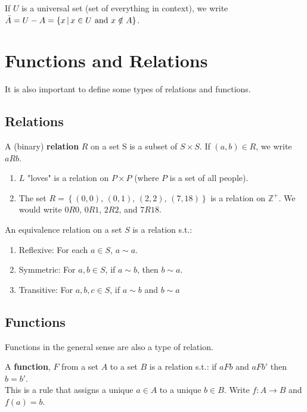 \documentclass[../main.tex]{subfiles}
\begin{document}
If \( U \) is a universal set (set of everything in context), we write
\( \bar{A} = U - A \\ = \{ x \, | \, x \in U \text{ and } x \notin A \} \).

\section{Functions and Relations}

It is also important to define some types of relations and functions.

\subsection{Relations}

\begin{definition}[Relation]
    A (binary) \textbf{relation} \( R \) on a set S is a subset of \( S \times S \). If \( (a,b) \in R \), we write \( aRb \).
\end{definition}

\begin{example}[of relations]

    \begin{enumerate}
        \item \( L \) "loves" is a relation on \( P \times P \) (where \( P \) is a set of all people).
        \item The set \( R = \left\{ (0,0), \, (0,1), \, (2,2), \, (7,18) \right\} \) is a relation on \( \mathbb{Z}^+ \). We would write \( 0R0 \), \( 0R1 \), \( 2R2 \), and \( 7R18 \).
    \end{enumerate}
\end{example}

\begin{definition}
    An equivalence relation on a set \( S \) is a relation s.t.:
    \begin{enumerate}
        \item Reflexive: For each \( a \in S \), \( a \sim a \).
        \item Symmetric: For \( a,b \in S \), if \( a \sim b \), then \( b \sim a \).
        \item Transitive: For \( a,b,c \in S \), if \( a \sim b \) and \( b \sim a \)
    \end{enumerate}
\end{definition}


\subsection{Functions}

Functions in the general sense are also a type of relation.
\begin{definition}[Function]
    A \textbf{function}, \( F \) from a set \( A \) to a set \( B \) is a relation s.t.:
    if \( aFb \) and \( aFb' \) then \( b = b' \). \\
    This is a rule that assigns a unique \( a \in A \) to a unique \( b \in B \).
    Write \( f: A \rightarrow B \) and \( f(a) = b \).
\end{definition}
\end{document}
